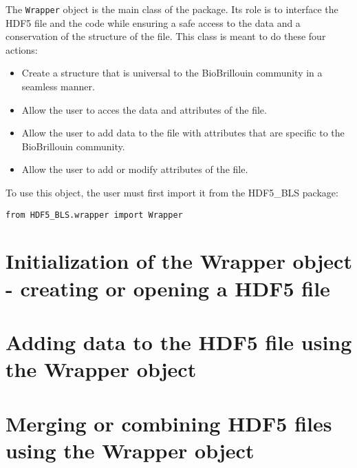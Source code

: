 The \texttt{Wrapper} object is the main class of the package. Its role is to interface the HDF5 file and the code while ensuring a safe access to the data and a conservation of the structure of the file. This class is meant to do these four actions:
\begin{itemize}
    \item Create a structure that is universal to the BioBrillouin community in a seamless manner.
    \item Allow the user to acces the data and attributes of the file.
    \item Allow the user to add data to the file with attributes that are specific to the BioBrillouin community.
    \item Allow the user to add or modify attributes of the file.
\end{itemize}

To use this object, the user must first import it from the HDF5\_BLS package:
\begin{lstlisting}
from HDF5_BLS.wrapper import Wrapper
\end{lstlisting}

\section{Initialization of the Wrapper object - creating or opening a HDF5 file}
    

\section{Adding data to the HDF5 file using the Wrapper object}
    

\section{Merging or combining HDF5 files using the Wrapper object}
    
